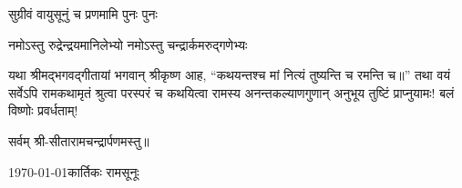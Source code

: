 {सुग्रीवं वायुसूनुं च प्रणमामि पुनः पुनः}

{नमोऽस्तु रुद्रेन्द्रयमानिलेभ्यो नमोऽस्तु चन्द्रार्कमरुद्गणेभ्यः}

यथा श्रीमद्भगवद्\-गीतायां भगवान् श्रीकृष्ण आह, ``कथयन्तश्च मां नित्यं तुष्यन्ति च रमन्ति च॥'' तथा वयं सर्वेऽपि रामकथामृतं श्रुत्वा परस्परं च कथयित्वा रामस्य अनन्तकल्याणगुणान् अनुभूय तुष्टिं प्राप्नुयामः! बलं विष्णोः प्रवर्धताम्!\\



\centerline{सर्वम् श्री-सीतारामचन्द्रार्पणमस्तु॥}
\endgroup
\medskip
\noindent\today \hfill कार्तिकः रामसूनूः